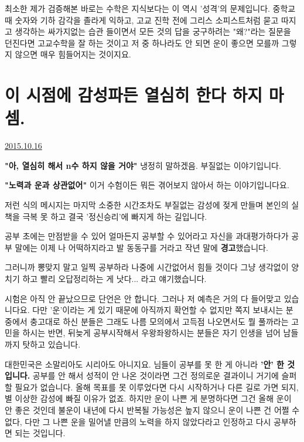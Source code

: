 최소한 제가 검증해본 바로는 수학은 지식보다는 이 역시 '성격'의 문제입니다.
중학교 때 숫자와 기하 감각을 졸라게 익하고, 고교 진학 전에 그리스 소피스트처럼 묻고 따지고 생각하는 싸가지없는 습관 들이면서
모든 것의 답을 궁구하려는 "왜?"라는 질문을 던진다면 고교수학을 잘 하는 것이고
저 중 하나라도 안 되면 운이 좋으면 모를까 그렇지 않으면 매우 힘들어지는 것이지요.
\vspace{5mm}






\section{이 시점에 감성파든 열심히 한다 하지 마셈.}
\href{https://www.kockoc.com/Apoc/418857}{2015.10.16}

\vspace{5mm}

\textbf{"아, 열심히 해서 n수 하지 않을 거야"}
냉정히 말하겠음. 부질없는 이야기입니다.
\vspace{5mm}

\textbf{"노력과 운과 상관없어"}
이거 수험이든 뭐든 겪어보지 않아서 하는 이야기입니다요.
\vspace{5mm}

저런 식의 메시지는 마지막 소중한 시간조차도 부질없는 감성에 젖게 만들며
본인의 실책을 극복 못 하고 결국 '정신승리'에 빠지게 하는 길입니다.
\vspace{5mm}

공부 초에는 만점받을 수 있어 얼마든지 공부할 수 있어라고 자신을 과대평가하다가
공부 말에는 이제 나 어떡하지라고 발 동동구를 거라고 작년 말에 \textbf{경고}했습니다.
\vspace{5mm}

그러니까 뽕맞지 말고 일찍 공부하라 나중에 시간없어서 힘들 것이다
그냥 생각없이 양치기 하고 빨리 오답정리하는 게 낫다... 라고 얘기했습니다.
\vspace{5mm}

시험은 아직 안 끝났으므로 단언은 안 합니다. 그러나 저 예측은 거의 다 들어맞고 있습니다요.
다만 '운'이라는 게 있기 때문에 아직까지 확언할 수 없지만
쪽지 보내시는 분 중에서 충고대로 하신 분들은 그래도 나름 모의에서 고득점 나오면서도 뭘 풀까라는 고민을 하시는 반면,
뒤늦게 공부시작해서 우왕좌왕하시는 분들은 자기 인생을 넘어 남들까지 탓하고 있습니다.
\vspace{5mm}

대한민국은 소말리아도 시리아도 아니지요. 님들이 공부를 못 한 게 아니라 \textbf{'안' 한 것입니다.}
공부를 안 해서 성적이 안 나온 것이라면 그건 정의로운 결과이니 거기에 슬퍼할 필요가 없습니다.
올해 목표를 못 이루었다면 다시 시작하거나 다른 길로 가면 되지, 별 이상한 감성에 빠질 이유가 없죠.
하지만 운이 나쁜 게 분명하다면 그건 올해 운이 안 좋은 것인데 불운이 내년에 다시 반복될 가능성은 높지 않으니
운이 나쁜 건 어쩔 수 없다, 다만 그 나쁜 운을 밀어낼 만큼의 노력을 하지 않았다라고 인정하고 다시 공부하면 되는 것입니다.
\vspace{5mm}


